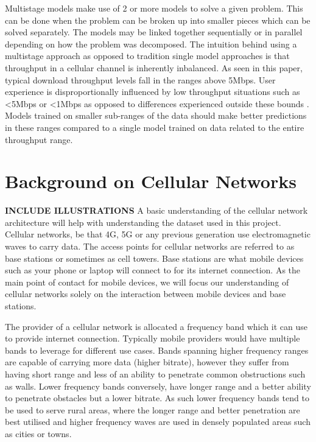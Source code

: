 Multistage models make use of 2 or more models to solve a given problem. This can be done when the problem can be broken up into smaller pieces which can be solved separately. The models may be linked together sequentially or in parallel depending on how the problem was decomposed. The intuition behind using a multistage approach as opposed to tradition single model approaches is that throughput in a cellular channel is inherently inbalanced. As seen in this paper, typical download throughput levels fall in the ranges above 5Mbps. User experience is disproportionally influenced by low throughput situations such as <5Mbps or <1Mbps as opposed to differences experienced outside these bounds \cite{raca2019improving}. Models trained on smaller sub-ranges of the data should make better predictions in these ranges compared to a single model trained on data related to the entire throughput range.

\section{Background on Cellular Networks}
\textbf{INCLUDE ILLUSTRATIONS}
A basic understanding of the cellular network architecture will help with understanding the dataset used in this project. Cellular networks, be that 4G, 5G or any previous generation use electromagnetic waves to carry data. The access points for cellular networks are referred to as base stations or sometimes as cell towers. Base stations are what mobile devices such as your phone or laptop will connect to for its internet connection. As the main point of contact for mobile devices, we will focus our understanding of cellular networks solely on the interaction between mobile devices and base stations.

The provider of a cellular network is allocated a frequency band which it can use to provide internet connection. Typically mobile providers would have multiple bands to leverage for different use cases. Bands spanning higher frequency ranges are capable of carrying more data (higher bitrate), however they suffer from having short range and less of an ability to penetrate  common obstructions such as walls. Lower frequency bands conversely, have longer range and a better ability to penetrate obstacles but a lower bitrate. As such lower frequency bands tend to be used to serve rural areas, where the longer range and better penetration are best utilised and higher frequency waves are used in densely populated areas such as cities or towns.

